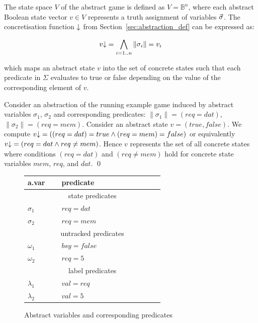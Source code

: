 The state space $V$ of the abstract game is defined as $V = \mathbb{B}^n$, where each abstract Boolean state vector $v\in V$ represents a truth assignment of variables $\vec{\sigma}$. The concretisation function $\mathord{\downarrow}$ from Section~\ref{sec:abstraction_def} can be expressed as: 

\begin{equation}
v\mathord{\downarrow}=\bigwedge_{i=1..n}\|\sigma_i\|=v_i
\end{equation}

\noindent which maps an abstract state $v$ into the set of concrete states such that each predicate in $\Sigma$ evaluates to true or false depending on the value of the corresponding element of $v$.

\begin{ex}
    \everymath{\mathtt{\xdef\tmp{\fam\the\fam\relax}\aftergroup\tmp}}
    \everydisplay{\mathtt{\xdef\tmp{\fam\the\fam\relax}\aftergroup\tmp}}
    Consider an abstraction of the running example game induced by abstract variables $\sigma_1$, $\sigma_2$ and corresponding predicates: $\|\sigma_1\| = (req=dat)$, $\|\sigma_2\| = (req = mem)$.  Consider an abstract state $v=(true,false)$. We compute $v\mathord{\downarrow} = ((req=dat) = true \land (req = mem)=false)$ or equivalently $v\mathord{\downarrow} = (req=dat \land req \neq mem)$.  Hence $v$ represents the set of all concrete states where conditions $(req=dat)$ and  $(req \neq mem)$ hold for concrete state variables $mem$, $req$, and $dat$.
    \qed
\end{ex}

\begin{figure}
    \centering
    \caption{Abstract variables and corresponding predicates}
    \label{fig:ex_game_abstraction}
    \begin{tabular}{|p{0.14\linewidth}|p{0.5\linewidth}|}
        \hline
        {\bf a.var} & {\bf predicate} \\
        \hline\hline
        \multicolumn{2}{|c|}{state predicates} \\
        \hline
        $\sigma_1$ & $req=dat$   \\
        $\sigma_2$ & $req=mem$   \\
        \hline\hline
        \multicolumn{2}{|c|}{untracked predicates} \\
        \hline
        $\omega_1$ & $bsy=false$ \\
        $\omega_2$ & $req=5$     \\
        \hline\hline
        \multicolumn{2}{|c|}{label predicates} \\
        \hline
        $\lambda_1$ & $val=req$  \\
        $\lambda_2$ & $val=5$    \\
        \hline
    \end{tabular}
\end{figure}

